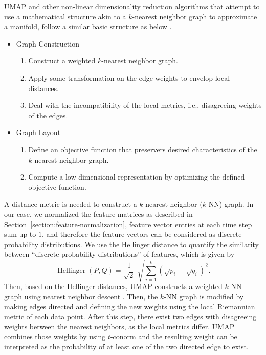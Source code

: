 UMAP and other non-linear dimensionality reduction algorithms that attempt to use a mathematical structure akin to a $k$-nearest neighbor graph to approximate a manifold, follow a similar basic structure as below \citep{mcinnes_umap_2020}.
\begin{itemize} \item Graph Construction \begin{enumerate}
		      \item Construct a weighted $k$-nearest neighbor graph.
		      \item Apply some transformation on the edge weights to envelop local distances.
		      \item Deal with the incompatibility of the local metrics, i.e., disagreeing weights of the edges.
	      \end{enumerate}
	\item Graph Layout
	      \begin{enumerate}
		      \item Define an objective function that preservers desired characteristics of the $k$-nearest neighbor graph.
		      \item Compute a low dimensional representation by optimizing the defined objective function.
	      \end{enumerate}
\end{itemize}

A distance metric is needed to construct a $k$-nearest neighbor ($k$-NN) graph.
In our case, we normalized the feature matrices as described in Section~\ref{section:feature-normalization}, feature vector entries at each time step sum up to $1$, and therefore the feature vectors  can be considered as discrete probability distributions.
We use the Hellinger distance \citep{hellinger_neue_1909} to quantify the similarity between ``discrete probability distributions'' of features, which is given by
\begin{equation}\label{equation:hellinger-distance}
	\operatorname{Hellinger}(P,Q)={\frac {1}{\sqrt {2}}}\;{\sqrt {\sum _{i=1}^{k}({\sqrt {p_{i}}}-{\sqrt {q_{i}}})^{2}}}.
\end{equation}
Then, based on the Hellinger distances, UMAP constructs a weighted $k$-NN graph using nearest neighbor descent \citep{dong_efficient_2011}.
Then, the $k$-NN graph is modified by making edges directed and defining the new weights using the local Riemannian metric of each data point.
After this step, there exist two edges with disagreeing weights between the nearest neighbors, as the local metrics differ.
UMAP combines those weights by using $t$-conorm and the resulting weight can be interpreted as the probability of at least one of the two directed edge to exist.

